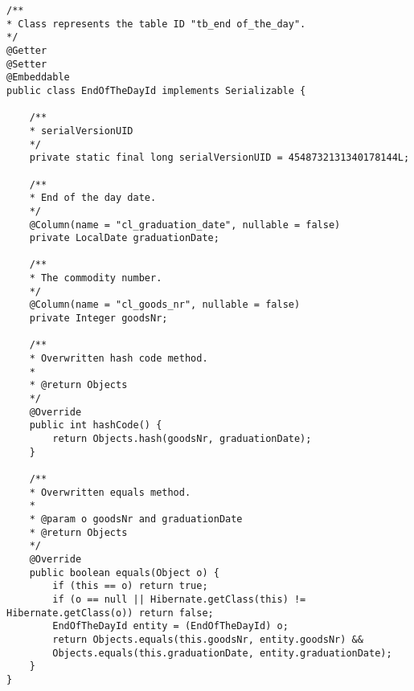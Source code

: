 \lstset{language=java}
\begin{lstlisting}[frame=tb, caption={Das Listing zeigt die Klasse EndOfTheDayId im Paket model}, label={lst:EndOfTheDayId}]
/**
* Class represents the table ID "tb_end of_the_day".
*/
@Getter
@Setter
@Embeddable
public class EndOfTheDayId implements Serializable {
	
	/**
	* serialVersionUID
	*/
	private static final long serialVersionUID = 4548732131340178144L;
	
	/**
	* End of the day date.
	*/
	@Column(name = "cl_graduation_date", nullable = false)
	private LocalDate graduationDate;
	
	/**
	* The commodity number.
	*/
	@Column(name = "cl_goods_nr", nullable = false)
	private Integer goodsNr;
	
	/**
	* Overwritten hash code method.
	*
	* @return Objects
	*/
	@Override
	public int hashCode() {
		return Objects.hash(goodsNr, graduationDate);
	}
	
	/**
	* Overwritten equals method.
	*
	* @param o goodsNr and graduationDate
	* @return Objects
	*/
	@Override
	public boolean equals(Object o) {
		if (this == o) return true;
		if (o == null || Hibernate.getClass(this) != Hibernate.getClass(o)) return false;
		EndOfTheDayId entity = (EndOfTheDayId) o;
		return Objects.equals(this.goodsNr, entity.goodsNr) &&
		Objects.equals(this.graduationDate, entity.graduationDate);
	}
}
\end{lstlisting}


